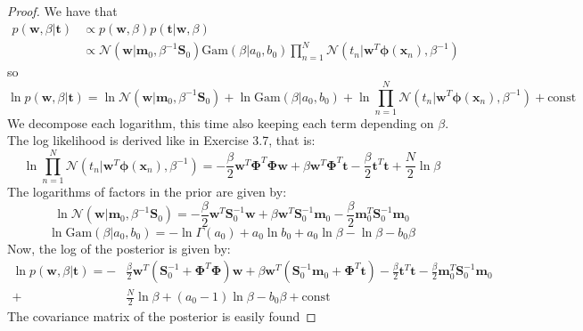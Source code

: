 \begin{proof}
    We have that
    \begin{align*}
        p(\mathbf{w}, \beta | \mathbf{t}) 
        &\propto p(\mathbf{w}, \beta) p(\mathbf{t} | \mathbf{w}, \beta) \\
        &\propto \mathcal{N}(\mathbf{w} | \mathbf{m}_0, \beta^{-1}\mathbf{S}_0) 
            \text{Gam}(\beta | a_0, b_0)
            \prod_{n=1}^N \mathcal{N}(t_n | \mathbf{w}^T\bm{\phi}(\mathbf{x}_n), \beta^{-1})
    \end{align*}
    so 
    \[
        \ln p(\mathbf{w}, \beta | \mathbf{t}) 
        = \ln \mathcal{N}(\mathbf{w} | \mathbf{m}_0, \beta^{-1}\mathbf{S}_0) 
            + \ln \text{Gam}(\beta | a_0, b_0)
            + \ln \prod_{n=1}^N \mathcal{N}(t_n | \mathbf{w}^T\bm{\phi}(\mathbf{x}_n), \beta^{-1})
            + \text{const}
    \] 
    We decompose each logarithm, this time also keeping each term
    depending on $\beta$. The log likelihood is derived like in Exercise 3.7,
    that is:
    \[
        \ln \prod_{n=1}^N \mathcal{N}(t_n | \mathbf{w}^T\bm{\phi}(\mathbf{x}_n), \beta^{-1})
        = -\frac{\beta}{2} \mathbf{w}^T\mathbf{\Phi}^T\mathbf{\Phi}\mathbf{w}
            + \beta \mathbf{w}^T \mathbf{\Phi}^T \mathbf{t} 
            -\frac{\beta}{2} \mathbf{t}^T\mathbf{t}
            + \frac{N}{2} \ln \beta
    \] 
    The logarithms of factors in the prior are given by:
    \[
        \ln \mathcal{N}(\mathbf{w} | \mathbf{m}_0, \beta^{-1}\mathbf{S}_0) 
        = -\frac{\beta}{2} \mathbf{w}^T\mathbf{S}_0^{-1}\mathbf{w} 
        + \beta \mathbf{w}^T\mathbf{S}_0^{-1}\mathbf{m}_0 
            - \frac{\beta}{2} \mathbf{m}_0^T\mathbf{S}_0^{-1}\mathbf{m}_0
    \] 
    \[
        \ln \text{Gam}(\beta | a_0, b_0)
        = -\ln \Gamma(a_0) + a_0\ln b_0 + a_0 \ln \beta - \ln \beta - b_0 \beta
    \] 
    Now, the log of the posterior is given by:
    \begin{align*}
        \ln p(\mathbf{w}, \beta | \mathbf{t})
        = -&\frac{\beta}{2} \mathbf{w}^T
            (\mathbf{S}_0^{-1} + \mathbf{\Phi}^T\mathbf{\Phi}) \mathbf{w}
            + \beta\mathbf{w}^T(\mathbf{S}_0^{-1} \mathbf{m}_0 
                + \mathbf{\Phi}^T \mathbf{t})
            - \frac{\beta}{2} \mathbf{t}^T\mathbf{t}
            - \frac{\beta}{2} \mathbf{m}_0^T\mathbf{S}_0^{-1}\mathbf{m}_0 \\
        +& \frac{N}{2} \ln \beta + (a_0 - 1)\ln \beta - b_0 \beta + \text{const}
    \end{align*}
    The covariance matrix of the posterior is easily found

\end{proof}
